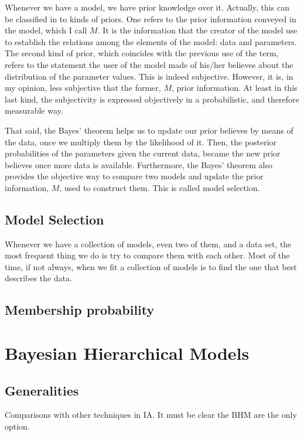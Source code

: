 Whenever we have a model, we have prior knowledge over it. Actually, this can be classified in to kinds of priors. One refers to the prior information conveyed in the model, which I call $M$. It is the information that the creator of the model use to establish the relations among the elements of the model: data and parameters. The second kind of prior, which coincides with the previous use of the term, refers to the statement the user of the model made of his/her believes about the distribution of the parameter values. This is indeed subjective. However, it is, in my opinion, less subjective that the former, $M$, prior information. At least in this last kind, the subjectivity is expressed objectively in a probabilistic, and therefore measurable way.

That said, the Bayes' theorem helps us to update our prior believes by means of the data, once we multiply them by the likelihood of it. Then, the posterior probabilities of the parameters given the current data, became the new prior believes once more data is available. Furthermore, the Bayes' theorem also provides the objective way to compare two models and update the prior information, $M$, used to construct them. This is called model selection.

\subsection{Model Selection}

Whenever we have a collection of models, even two of them, and a data set,  the most frequent thing we do is try to compare them with each other. Most of the time, if not always, when we fit a collection of models is to find the one that best describes the data. 




\subsection{Membership probability}



\section{Bayesian Hierarchical Models}
\subsection{Generalities}
Comparisons with other techniques in IA.
It must be clear the BHM are the only option.
